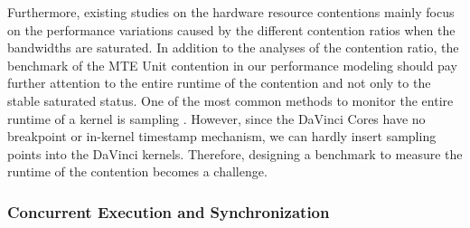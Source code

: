 \documentclass[12pt]{extbook}
\begin{document}
Furthermore, existing studies on the hardware resource contentions \cite{DBLP:conf/sc/HristeaLK97, DBLP:conf/usenix/SrikanthanDS15} mainly focus on the performance variations caused by the different contention ratios when the bandwidths are saturated. In addition to the analyses of the contention ratio, the benchmark of the MTE Unit contention in our performance modeling should pay further attention to the entire runtime of the contention and not only to the stable saturated status. One of the most common methods to monitor the entire runtime of a kernel is sampling \cite{IBM_profiler, Del_profiler, Goo_profiler}. However, since the DaVinci Cores have no breakpoint or in-kernel timestamp mechanism, we can hardly insert sampling points into the DaVinci kernels. Therefore, designing a benchmark to measure the runtime of the contention becomes a challenge.

\subsubsection{Concurrent Execution and Synchronization}
\end{document}
